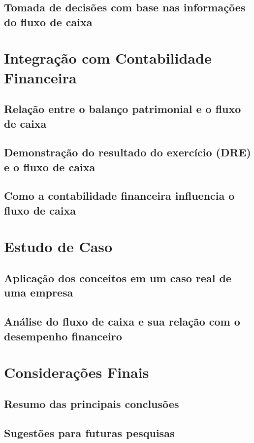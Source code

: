 \documentclass[a4paper,12pt]{article}
\newcommand{\printingbibliography}{%

    \pagestyle{myheadings}
    \markright{}
    \sloppy
    \printbibliography[heading=bibintoc, %
                   title=Refer\^encias %
                  ]
    \fussy%
}
\begin{document}
\subsection{Tomada de decisões com base nas informações do fluxo de caixa}

\section{Integração com Contabilidade Financeira}

\subsection{Relação entre o balanço patrimonial e o fluxo de caixa}
\subsection{Demonstração do resultado do exercício (DRE) e o fluxo de caixa}
\subsection{Como a contabilidade financeira influencia o fluxo de caixa}

\section{Estudo de Caso}

\subsection{Aplicação dos conceitos em um caso real de uma empresa}
\subsection{Análise do fluxo de caixa e sua relação com o desempenho financeiro}

\section{Considerações Finais}

\subsection{Resumo das principais conclusões}
\subsection{Sugestões para futuras pesquisas}

\printingbibliography
\end{document}
